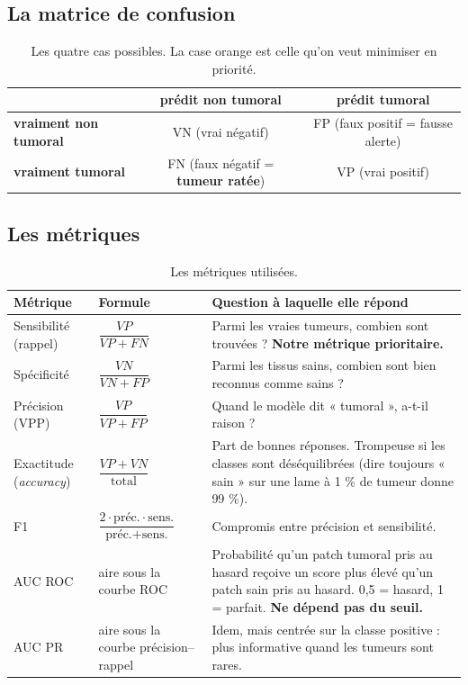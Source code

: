\documentclass[11pt,a4paper]{article}
\begin{document}
\subsection{La matrice de confusion}
\begin{table}[H]
\centering
\begin{tabular}{lcc}
\toprule
 & \textbf{prédit non tumoral} & \textbf{prédit tumoral} \\
\midrule
\textbf{vraiment non tumoral} & VN (vrai négatif) & FP (faux positif = fausse alerte) \\
\textbf{vraiment tumoral} & \cellcolor{orangeclair}FN (faux négatif = \textbf{tumeur ratée}) & VP (vrai positif) \\
\bottomrule
\end{tabular}
\caption{Les quatre cas possibles. La case orange est celle qu'on veut minimiser en priorité.}
\end{table}

\subsection{Les métriques}
\begin{table}[H]
\centering
\small
\begin{tabularx}{\textwidth}{l>{\centering\arraybackslash}p{3.4cm}X}
\toprule
\textbf{Métrique} & \textbf{Formule} & \textbf{Question à laquelle elle répond} \\
\midrule
Sensibilité (rappel) & $\dfrac{VP}{VP+FN}$ & Parmi les vraies tumeurs, combien sont trouvées ?
\textbf{Notre métrique prioritaire.} \\[8pt]
Spécificité & $\dfrac{VN}{VN+FP}$ & Parmi les tissus sains, combien sont bien reconnus comme sains ? \\[8pt]
Précision (VPP) & $\dfrac{VP}{VP+FP}$ & Quand le modèle dit « tumoral », a-t-il raison ? \\[8pt]
Exactitude (\emph{accuracy}) & $\dfrac{VP+VN}{\text{total}}$ & Part de bonnes réponses. Trompeuse si les classes
sont déséquilibrées (dire toujours « sain » sur une lame à 1 \% de tumeur donne 99 \%). \\[8pt]
F1 & $\dfrac{2\cdot\text{préc.}\cdot\text{sens.}}{\text{préc.}+\text{sens.}}$ & Compromis entre précision et sensibilité. \\[8pt]
AUC ROC & aire sous la courbe ROC & Probabilité qu'un patch tumoral pris au hasard reçoive un score plus élevé
qu'un patch sain pris au hasard. 0,5 = hasard, 1 = parfait. \textbf{Ne dépend pas du seuil.} \\[8pt]
AUC PR & aire sous la courbe précision–rappel & Idem, mais centrée sur la classe positive : plus informative
quand les tumeurs sont rares. \\
\bottomrule
\end{tabularx}
\caption{Les métriques utilisées.}
\end{table}
\end{document}
